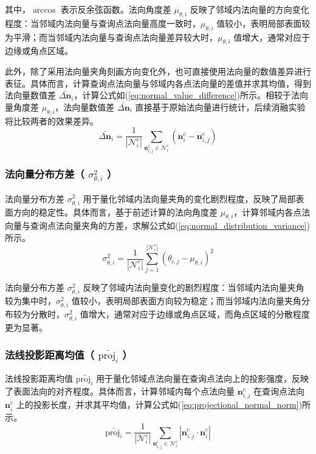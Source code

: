 其中，$\arccos$ 表示反余弦函数。法向角度差 $\mu_{\theta,i}$ 反映了邻域内法向量的方向变化程度：当邻域内法向量与查询点法向量高度一致时，$\mu_{\theta,i}$ 值较小，表明局部表面较为平滑；而当邻域内法向量与查询点法向量差异较大时，$\mu_{\theta,i}$ 值增大，通常对应于边缘或角点区域。

此外，除了采用法向量夹角刻画方向变化外，也可直接使用法向量的数值差异进行表征。具体而言，计算查询点法向量与邻域内各点法向量的差值并求其均值，得到法向量数值差 $\bar{\Delta \mathbf{n}}_i$，计算公式如(\ref{eq:normal_value_difference})所示。相较于法向量角度差 $\mu_{\theta,i}$，法向量数值差 $\bar{\Delta \mathbf{n}}_i$ 直接基于原始法向量进行统计，后续消融实验将比较两者的效果差异。
\begin{equation}
    \bar{\Delta \mathbf{n}}_i = \frac{1}{|\mathcal{N}_i^\text{c}|} \sum_{\mathbf{n}_{i,j}^\text{c} \in \mathcal{N}_i^\text{c}} ( \mathbf{n}_i^\text{c} - \mathbf{n}_{i,j}^\text{c} )
    \label{eq:normal_value_difference}
\end{equation}

\subsubsection{法向量分布方差（ $\sigma^2_{\theta,i}$ ）}
法向量分布方差 $\sigma^2_{\theta,i}$ 用于量化邻域内法向量夹角的变化剧烈程度，反映了局部表面方向的稳定性。具体而言，基于前述计算的法向角度差 $\mu_{\theta,i}$，计算邻域内各点法向量与查询点法向量夹角的方差，求解公式如(\ref{eq:normal_distribution_variance})所示。
\begin{equation}
    \sigma^2_{\theta,i} = \frac{1}{|\mathcal{N}_i^\text{c}|} \sum_{j=1}^{|\mathcal{N}_i^\text{c}|} (\theta_{i,j} - \mu_{\theta,i})^2
    \label{eq:normal_distribution_variance}
\end{equation}

法向量分布方差 $\sigma^2_{\theta,i}$ 反映了邻域内法向量变化的剧烈程度：当邻域内法向量夹角较为集中时，$\sigma^2_{\theta,i}$ 值较小，表明局部表面方向较为稳定；而当邻域内法向量夹角分布较为分散时，$\sigma^2_{\theta,i}$ 值增大，通常对应于边缘或角点区域，而角点区域的分散程度更为显著。

\subsubsection{法线投影距离均值（ $\bar{\text{proj}_i}$ ）}
法线投影距离均值 $\bar{\text{proj}_i}$ 用于量化邻域点法向量在查询点法向上的投影强度，反映了表面法向的对齐程度。具体而言，计算邻域内每个点法向量 $\mathbf{n}_{i,j}^\text{c}$ 在查询点法向 $\mathbf{n}_i^\text{c}$ 上的投影长度，并求其平均值，计算公式如(\ref{eq:projectional_normal_norm})所示。
\begin{equation}
    \bar{\text{proj}_i} = \frac{1}{|\mathcal{N}_i^\text{c}|} \sum_{\mathbf{n}_{i,j}^\text{c} \in \mathcal{N}_i^\text{c}} \left| \mathbf{n}_{i,j}^\text{c} \cdot \mathbf{n}_i^\text{c} \right|
    \label{eq:projectional_normal_norm}
\end{equation}

